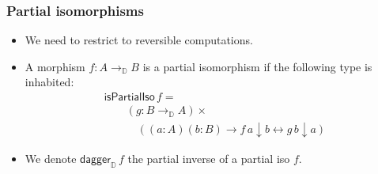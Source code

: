 \documentclass[12pt,t]{beamer}
\newcommand{\red}[1]{\textcolor{red}{#1}}
\newcommand{\Set}{\mathsf{Set}}
\newcommand{\Inv}{\mathsf{Inv}}
\newcommand{\dn}{\downarrow}
\newcommand{\D}{\mathbb{D}}
\newcommand{\Dapprox}{\mathbb{D}_{\approx}}
\newcommand{\piso}{\mathsf{isPartialIso}}
\newcommand{\daggerD}{\mathsf{dagger}_\D}
\begin{document}
  

\begin{frame}

  \frametitle{Partial isomorphisms}
  
  \begin{itemize}
  \item We need to restrict to reversible computations.
  \item A morphism $f : A \to_\D B$ is a partial isomorphism if
    the following type is inhabited: %
    \[
    \begin{array}{l}
      \piso \,f = \\
      \qquad (g : B \to_\D A) \times \\
      \qquad \quad \left( (a : A) (b : B) \to  f
      \,a \dn b \leftrightarrow g \,b \dn a  \right)  
    \end{array}
    \]
    \item We denote $\daggerD\,f$ the partial inverse of a partial iso $f$.
  \end{itemize}
  
  
\end{frame}
\end{document}
